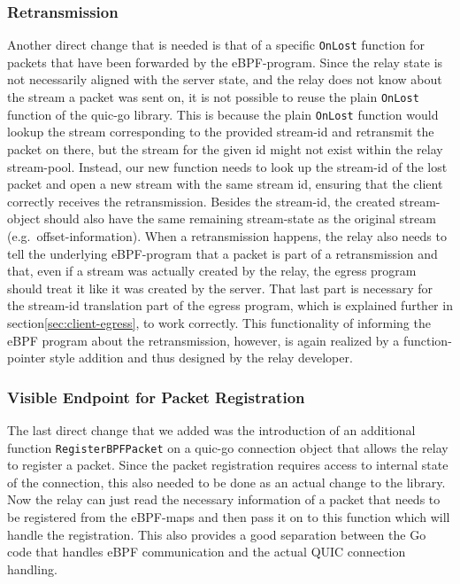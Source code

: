 \subsubsection*{Retransmission}
Another direct change that is needed is that of a specific \verb|OnLost| function for packets that 
have been forwarded by the eBPF-program.
Since the relay state is not necessarily aligned with the server state, and the relay does not know
about the stream a packet was sent on, it is not possible to reuse the plain \verb|OnLost| function
of the quic-go library.
This is because the plain \verb|OnLost| function would lookup the stream corresponding to the provided stream-id and 
retransmit the packet on there, but the stream for the given id might not exist within the relay stream-pool.
Instead, our new function needs to look up the stream-id of the lost packet and open a new stream with
the same stream id, ensuring that the client correctly receives the retransmission.
Besides the stream-id, the created stream-object should also have the same remaining stream-state
as the original stream (e.g.~offset-information).  
When a retransmission happens, the relay also needs to tell the underlying eBPF-program that a packet is part of a 
retransmission and that, even if a stream was actually created by the relay, the egress program should treat it like 
it was created by the server.
That last part is necessary for the stream-id translation part of the egress program, which is explained further
in section\nobreakspace\ref{sec:client-egress}, to work correctly.
This functionality of informing the eBPF program about the retransmission, however, is again realized by a 
function-pointer style addition and thus designed by the relay developer.

\subsubsection*{Visible Endpoint for Packet Registration}
The last direct change that we added was the introduction of an additional function \verb|RegisterBPFPacket| 
on a quic-go connection object that allows the relay to register a packet.
Since the packet registration requires access to internal state of the connection, this also needed to be 
done as an actual change to the library.
Now the relay can just read the necessary information of a packet that needs to be registered
from the eBPF-maps and then pass it on to this function which will handle the registration.
This also provides a good separation between the Go code that handles eBPF communication and the actual
QUIC connection handling.